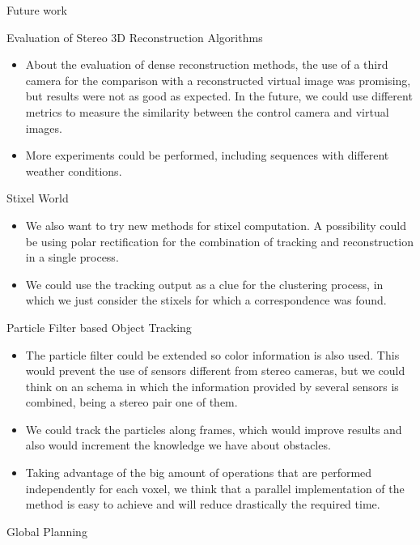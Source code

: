 \begin{frame}{Future work}
\begin{itemize}
{\begin{itemize}
    \end{itemize}
    }
     {
    \item Evaluation of Stereo 3D Reconstruction Algorithms
    \begin{itemize}
      \item About the evaluation of dense reconstruction methods, the use of a third camera for the comparison with a reconstructed virtual image was promising, but results were not as good as expected. In the future, we could use different metrics to measure the similarity between the control camera and virtual images. 
      \item More experiments could be performed, including sequences with different weather conditions.
    \end{itemize}
    }
     {
    \tiny
    \item Stixel World
    \begin{itemize}
      \tiny
      \item We also want to try new methods for stixel computation. A possibility could be using polar rectification for the combination of tracking and reconstruction in a single process. 
      \item We could use the tracking output as a clue for the clustering process, in which we just consider the stixels for which a correspondence was found.
    \end{itemize}
    \item Particle Filter based Object Tracking
    \begin{itemize}
      \tiny
      \item The particle filter could be extended so color information is also used. This would prevent the use of sensors different from stereo cameras, but we could think on an schema in which the information provided by several sensors is combined, being a stereo pair one of them.
      \item We could track the particles along frames, which would improve results and also would increment the knowledge we have about obstacles.
      \item Taking advantage of the big amount of operations that are performed independently for each voxel, we think that a parallel implementation of the method is easy to achieve and will reduce drastically the required time.
    \end{itemize}
    }
     {
    \item Global Planning
    \begin{itemize}

\end{itemize}}
\end{itemize}
\end{frame}
